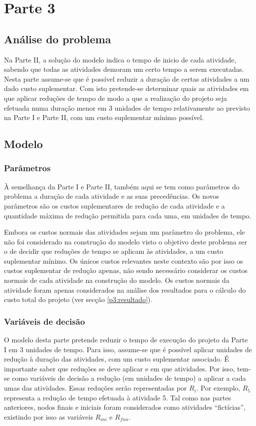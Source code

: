 \chapter{Parte 3}
\label{cap:p3}

\section{Análise do problema}

Na Parte II, a solução do modelo indica o tempo de inicio de cada atividade,
sabendo que todas as atividades demoram um certo tempo a serem executadas. Nesta parte assume-se
que é possível reduzir a duração de certas atividades a um dado custo
suplementar. Com isto pretende-se determinar quais as atividades em
que aplicar reduções de tempo de modo a que a realização do projeto seja
efetuada numa duração menor em 3 unidades de tempo relativamente ao previsto na Parte I e Parte II, com um custo suplementar mínimo possível. 


\section{Modelo}

\subsection{Parâmetros}

À semelhança da Parte I e Parte II, também aqui se tem como parâmetros do problema
a duração de cada atividade e as suas precedências. Os novos parâmetros são os
custos suplementares de redução de cada atividade e a quantidade máxima de
redução permitida para cada uma, em unidades de tempo.

Embora os custos normais das atividades sejam um parâmetro do problema, ele não foi considerado na construção do modelo visto o objetivo deste problema ser o de decidir que reduções de tempo se aplicam às atividades, a um custo suplementar mínimo. Os únicos custos relevantes neste contexto são por isso os custos suplementar de redução apenas, não sendo necessário considerar os custos normais de cada atividade na construção do modelo. Os custos normais da atividade foram apenas considerados na análise dos resultados para o cálculo do custo total do projeto (ver secção \ref{p3:resultado}).

\subsection{Variáveis de decisão}
\label{p3:vardec}
O modelo desta parte pretende reduzir o tempo de execução do
projeto da Parte I em 3 unidades de tempo. Para isso, assume-se que é possível aplicar unidades de redução à duração das atividades, com um custo suplementar associado. É importante saber que reduções se deve aplicar e em que atividades. Por isso, tem-se como variáveis de decisão
a redução (em unidades de tempo) a aplicar a cada umas das atividades. Essas reduções serão representadas por $R_{i}$. Por exemplo, $R_{5}$ representa a redução de tempo efetuada à atividade 5. Tal como nas partes anteriores, nodos finais e iniciais foram considerados como atividades ``fictícias'', existindo por isso as variáveis $R_{ini}$ e $R_{fim}$.

